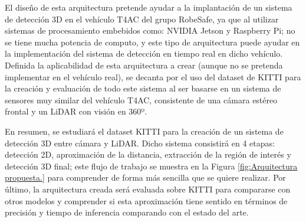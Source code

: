 El diseño de esta arquitectura pretende ayudar a la implantación de un sistema de detección 3D en el vehículo \ac{T4AC} del grupo RobeSafe, ya que al utilizar sistemas de procesamiento embebidos como: NVIDIA Jetson y Raspberry Pi; no se tiene mucha potencia de computo, y este tipo de arquitectura puede ayudar en la implementación del sistema de detección en tiempo real en dicho vehículo. Definida la aplicabilidad de esta arquitectura a crear (aunque no se pretenda implementar en el vehículo real), se decanta por el uso del dataset de KITTI para la creación y evaluación de todo este sistema al ser basarse en un sistema de sensores muy similar del vehículo \ac{T4AC}, consistente de una cámara estéreo frontal y un \ac{LiDAR} con visión en 360º.

En resumen, se estudiará el dataset KITTI para la creación de un sistema de detección 3D entre cámara y \ac{LiDAR}. Dicho sistema consistirá en 4 etapas: detección 2D, aproximación de la distancia, extracción de la región de interés y detección 3D final; este flujo de trabajo se muestra en la Figura \ref{fig:Arquitectura propuesta.} para comprender de forma más sencilla que se quiere realizar. Por último, la arquitectura creada será evaluada sobre KITTI para compararse con otros modelos y comprender si esta aproximación tiene sentido en términos de precisión y tiempo de inferencia comparando con el estado del arte.

